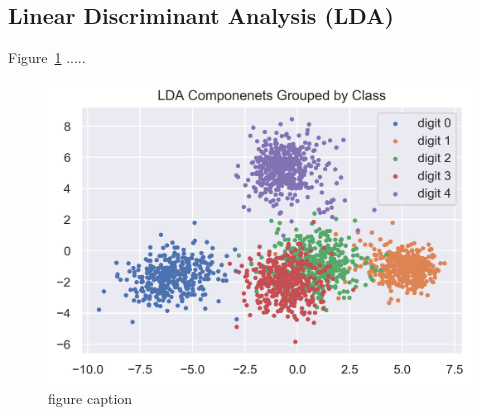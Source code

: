 \clearpage{}
\subsection{Linear Discriminant Analysis (LDA)}

Figure~\ref{fig:fig7} .....

\begin{figure}[htb]
 \centering
\includegraphics[width=\textwidth]{assignment1/2-5-LDA_dim_reduction.png}
\caption{\label{fig:fig7}figure caption}
\end{figure}